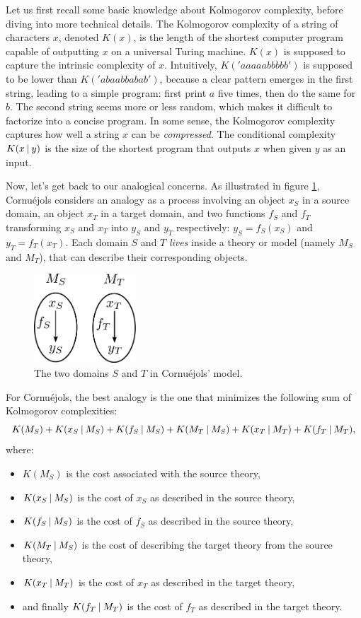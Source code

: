 Let us first recall some basic knowledge about Kolmogorov complexity,
before diving into more technical details. The Kolmogorov complexity of a
string of characters $x$, denoted $K(x)$, is the length of the shortest
computer program capable of outputting $x$ on a universal Turing machine. $K(x)$ is supposed to capture the
intrinsic complexity of $x$. Intuitively, $K('aaaaabbbbb')$ is supposed to be
lower than $K('abaabbabab')$, because a clear pattern emerges in the first
string, leading to a simple program: first print $a$ five times, then do the
same for $b$. The second string seems more or less random, which makes it
difficult to factorize into a concise program. In some sense, the Kolmogorov
complexity captures how well a string $x$ can be \textit{compressed}. The
conditional complexity $K(x \:\vert\: y)$ is the size of the shortest program that
outputs $x$ when given $y$ as an input.

Now, let's get back to our analogical concerns. As illustrated in figure
\ref{FIG:cornuejols_model}, Cornuéjols considers an analogy as a process
involving an object $x_S$ in a source domain, an object $x_T$ in a target
domain, and two functions $f_S$ and $f_T$ transforming $x_S$ and $x_T$ into
$y_S$ and $y_T$ respectively: $y_S = f_S(x_S)$ and $y_T = f_T(x_T)$. Each
domain $S$ and $T$ \textit{lives} inside a theory or model (namely $M_S$ and
$M_T$), that can describe their corresponding objects.

\begin{figure}[!h]
\centering
\includegraphics[width=1.5in]{figures/cornuejols_model.pdf}
\caption{The two domains $S$ and $T$ in Cornuéjols' model.}
\label{FIG:cornuejols_model}
\end{figure}

For Cornuéjols, the best analogy is the one that minimizes the following sum of
Kolmogorov complexities:
$$K(M_S) + K(x_S \:\vert\: M_S) + K(f_S \:\vert\: M_S) + K(M_T \:\vert\: M_S) + K(x_T
\:\vert\: M_T) + K(f_T \:\vert\: M_T),$$
where:
\begin{itemize}
   \item $K(M_S)$ is the cost associated with the source theory,
   \item $K(x_S \:\vert\: M_S)$ is the cost of $x_S$ as described in the source
     theory,
   \item $K(f_S \:\vert\: M_S)$ is the cost of $f_S$ as described in the source
     theory,
   \item $K(M_T \:\vert\: M_S)$ is the cost of describing the target theory from
     the source theory,
   \item $K(x_T \:\vert\: M_T)$ is the cost of $x_T$ as described in the target
     theory,
   \item and finally $K(f_T \:\vert\: M_T)$ is the cost of $f_T$ as described in
     the target theory.
\end{itemize}

